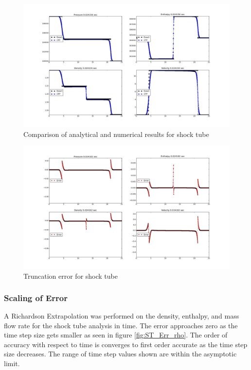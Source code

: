     \pagebreak
    \begin{figure}[!h]
    	\centering
    	\includegraphics[width=1.30\textwidth,angle=90.0]{images/wave1_200dP_N1000/tmp/plot_shocktube_0034}
    	\caption{Comparison of analytical and numerical results for shock tube}
    	\label{fig:V2_result_top}
    \end{figure}
    
    \pagebreak
    \begin{figure}[!h]
    	\centering
    	\includegraphics[width=1.30\textwidth,angle=90.0]{images/wave1_200dP_N1000/tmp/plot_st_err_0679}
    	\caption{Truncation error for shock tube}
    	\label{fig:V2_result_bottom}
    \end{figure}
    
    \pagebreak
    \subsubsection{Scaling of Error}
    
    A Richardson Extrapolation was performed on the density, enthalpy, and mass
    flow rate for the shock tube analysis in time. The error approaches zero
    as the time step size gets smaller as seen in figure
    \ref{fig:ST_Err_rho}. The order of accuracy with respect to time is
    converges to first order accurate as the time step size decreases. The range
    of time step values shown are within the asymptotic limit. 
    

